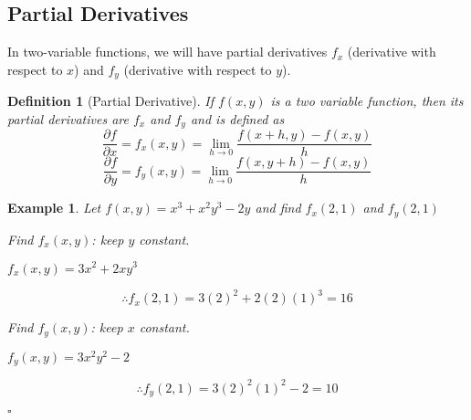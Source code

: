 \documentclass[12pt,a4paper]{article}
\newtheorem{df}{Definition}[subsection]
\newtheorem{eg}{Example}[subsection]
\newenvironment*{ans}{\par\indent{\textit{Answer. }}\par}{\par\hfill{$\square$}\par}
\def\del{\partial}
\def\pdfdx{\displaystyle\frac{\del f}{\del x}}
\def\pdfdy{\displaystyle\frac{\del f}{\del y}}
\begin{document}
\subsection{Partial Derivatives}
In two-variable functions, we will have partial derivatives $f_x$ (derivative with respect to $x$) and $f_y$ (derivative with respect to $y$).
\begin{df}[Partial Derivative]
	If $f(x,y)$ is a two variable function, then its partial derivatives are $f_x$ and $f_y$ and is defined as \[\pdfdx=f_x(x,y)=\lim_{h\to0}\frac{f(x+h,y)-f(x,y)}{h}\]\[\pdfdy=f_y(x,y)=\lim_{h\to0}\frac{f(x,y+h)-f(x,y)}{h}\]	
\end{df}
\begin{eg}
	Let $f(x,y)=x^3+x^2y^3-2y$ and find $f_x(2,1)$ and $f_y(2,1)$
	\begin{ans}
		Find $f_x(x,y)$: keep $y$ constant.\par $f_x(x,y)=3x^2+2xy^3$\par \[\therefore f_x(2,1)=3(2)^2+2(2)(1)^3=16\]\par Find $f_y(x,y)$: keep $x$ constant.\par $f_y(x,y)=3x^2y^2-2$\par\[\therefore f_y(2,1)=3(2)^2(1)^2-2=10\]
	\end{ans}
\end{eg}
\end{document}
